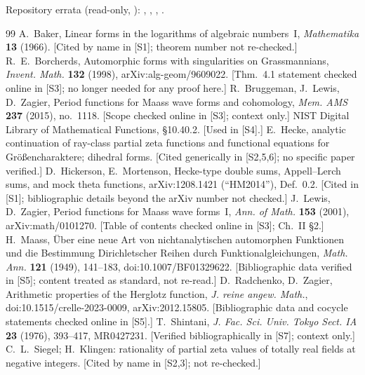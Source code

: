 \documentclass[11pt]{article}
\theoremstyle{definition}
\newcommand{\src}[1]{\textup{[S#1]}}
\begin{document}
Repository errata (read-only, ): ,
, ,
.

\begin{thebibliography}{99}\small
{} A.~Baker, Linear forms in the logarithms of algebraic numbers~I, \emph{Mathematika} \textbf{13} (1966). [Cited by name in \src{1}; theorem number not re-checked.]
 R.~E.~Borcherds, Automorphic forms with singularities on Grassmannians, \emph{Invent. Math.} \textbf{132} (1998), arXiv:alg-geom/9609022. [Thm.~4.1 statement checked online in \src{3}; no longer needed for any proof here.]
 R.~Bruggeman, J.~Lewis, D.~Zagier, Period functions for Maass wave forms and cohomology, \emph{Mem. AMS} \textbf{237} (2015), no.~1118. [Scope checked online in \src{3}; context only.]
 NIST Digital Library of Mathematical Functions, \S10.40.2. [Used in \src{4}.]
 E.~Hecke, analytic continuation of ray-class partial zeta functions and functional equations for Gr\"o\ss encharaktere; dihedral forms. [Cited generically in \src{2,5,6}; no specific paper verified.]
 D.~Hickerson, E.~Mortenson, Hecke-type double sums, Appell--Lerch sums, and mock theta functions, arXiv:1208.1421 (``HM2014''), Def.~0.2. [Cited in \src{1}; bibliographic details beyond the arXiv number not checked.]
 J.~Lewis, D.~Zagier, Period functions for Maass wave forms~I, \emph{Ann. of Math.} \textbf{153} (2001), arXiv:math/0101270. [Table of contents checked online in \src{3}; Ch.~II \S2.]
 H.~Maass, \"Uber eine neue Art von nichtanalytischen automorphen Funktionen und die Bestimmung Dirichletscher Reihen durch Funktionalgleichungen, \emph{Math. Ann.} \textbf{121} (1949), 141--183, doi:10.1007/BF01329622. [Bibliographic data verified in \src{5}; content treated as standard, not re-read.]
 D.~Radchenko, D.~Zagier, Arithmetic properties of the Herglotz function, \emph{J. reine angew. Math.}, doi:10.1515/crelle-2023-0009, arXiv:2012.15805. [Bibliographic data and cocycle statements checked online in \src{5}.]
 T.~Shintani, \emph{J. Fac. Sci. Univ. Tokyo Sect. IA} \textbf{23} (1976), 393--417, MR0427231. [Verified bibliographically in \src{7}; context only.]
 C.~L.~Siegel; H.~Klingen: rationality of partial zeta values of totally real fields at negative integers. [Cited by name in \src{2,3}; not re-checked.]

\end{thebibliography}
\end{document}
